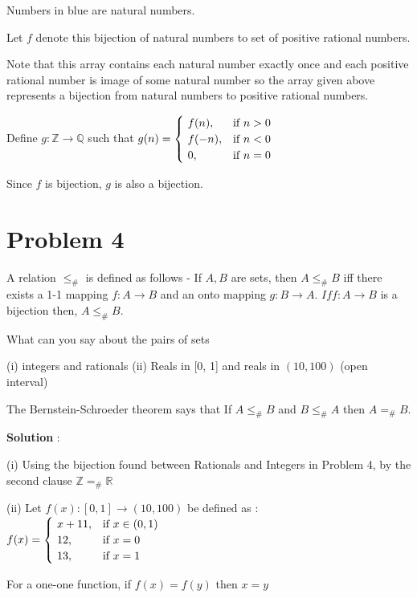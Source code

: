\documentclass{article}
\begin{document}
    \quad Numbers in blue are natural numbers. 
    
    \quad Let $f$ denote this bijection of natural numbers to set of positive rational numbers.
    
    \quad Note that this array contains each natural number exactly once and each positive rational number is image of some natural number so the array given above represents a bijection from natural numbers to positive rational numbers. 
    
    \quad Define $g: \mathbb{Z}\rightarrow \mathbb{Q}$ such that $g(n)= \begin{cases}
        ~f(n), & \hbox{if $n>0$} \\
        ~f(-n), & \hbox{if $n<0$} \\
        ~0, & \hbox{if $n=0$}
    \end{cases}$

    \quad Since $f$ is bijection, $g$ is also a bijection.

    \section*{Problem 4}  A relation $ \leq_{\#}$ is defined as follows - If $A, B$ are sets, then $A \leq_{\#} B$ iff there exists a 1-1 mapping $f : A \rightarrow B$ and an onto mapping $g : B \rightarrow A$. $If f : A \rightarrow B$ is a bijection then, $A\leq_{\#} B$.
    
What can you say about the pairs of sets

(i) integers and rationals (ii) Reals in [0, 1] and reals in $(10, 100)$ (open interval)

The Bernstein-Schroeder theorem says that If $A \leq_{\#} B$ and $B \leq_{\#} A$ then $A =_{\#} B$.
    
\textbf{Solution} :

    (i) Using the bijection found between Rationals and Integers in Problem 4, by the second clause $\mathbb{Z} =_{\#} \mathbb{R}$
    
    (ii) Let $f(x): [0,1] \to (10, 100)$  be defined as : $f(x) = 
        \begin{cases}
               ~x+11, & \hbox{if $x \in (0, 1)$}\\
               ~12, & \hbox{if $x = 0$}\\
               ~13, &\hbox{if $x = 1$}\\
            \end{cases}$
            
    \quad For a one-one function, if $f(x) = f(y)$ then $x = y$
    
\end{document}

